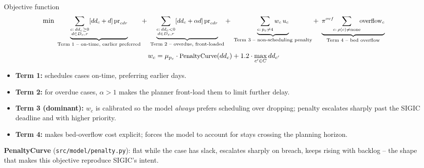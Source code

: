 \documentclass[10pt,aspectratio=169]{beamer}
\begin{document}
\begin{frame}{Objective function}
  \[\small
    \min\;
    \underbrace{\sum_{\substack{c:\,dd_c\ge0\\d\in D_c,r}}
      [dd_c+d]\,\text{pr}_{cdr}}_{\text{Term 1 -- on-time, earlier preferred}}
    +\;
    \underbrace{\sum_{\substack{c:\,dd_c<0\\d\in D_c,r}}
      [dd_c+\alpha d]\,\text{pr}_{cdr}}_{\text{Term 2 -- overdue, front-loaded}}
    +\;
    \underbrace{\sum_{c:\,p_c\ne4} w_c\,u_c}_{\text{Term 3 -- non-scheduling penalty}}
    +\;
    \underbrace{\pi^{ovf}\!\!\sum_{c:\,\rho(c)\ne\text{none}}\!\!\text{overflow}_c}_{\text{Term 4 -- bed overflow}}
  \]
  \[\small
    w_c = \mu_{p_c}\cdot\text{PenaltyCurve}(dd_c) + 1.2\cdot\max_{c'\in C}dd_{c'}
  \]
  \begin{itemize}\footnotesize
    \item \textbf{Term 1:} schedules cases on-time, preferring earlier days.
    \item \textbf{Term 2:} for overdue cases, $\alpha>1$ makes the planner
      front-load them to limit further delay.
    \item \textbf{Term 3 (dominant):} $w_c$ is calibrated so the model
      \emph{always} prefers scheduling over dropping; penalty escalates
      sharply past the SIGIC deadline and with higher priority.
    \item \textbf{Term 4:} makes bed-overflow cost explicit; forces the
      model to account for stays crossing the planning horizon.
  \end{itemize}
  \footnotesize\textbf{PenaltyCurve} (\texttt{src/model/penalty.py}): flat
  while the case has slack, escalates sharply on breach, keeps rising with
  backlog -- the shape that makes this objective reproduce SIGIC's intent.
\end{frame}
\end{document}
